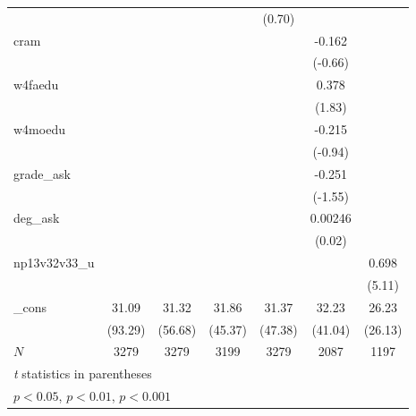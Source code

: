 {\begin{tabular}{l*{6}{c}}
            &                     &                     &                     &      (0.70)         &                     &                     \\
[1em]
cram        &                     &                     &                     &                     &      -0.162         &                     \\
            &                     &                     &                     &                     &     (-0.66)         &                     \\
[1em]
w4faedu     &                     &                     &                     &                     &       0.378         &                     \\
            &                     &                     &                     &                     &      (1.83)         &                     \\
[1em]
w4moedu     &                     &                     &                     &                     &      -0.215         &                     \\
            &                     &                     &                     &                     &     (-0.94)         &                     \\
[1em]
grade\_ask   &                     &                     &                     &                     &      -0.251         &                     \\
            &                     &                     &                     &                     &     (-1.55)         &                     \\
[1em]
deg\_ask     &                     &                     &                     &                     &     0.00246         &                     \\
            &                     &                     &                     &                     &      (0.02)         &                     \\
[1em]
np13v32v33\_u&                     &                     &                     &                     &                     &       0.698\sym{***}\\
            &                     &                     &                     &                     &                     &      (5.11)         \\
[1em]
\_cons      &       31.09\sym{***}&       31.32\sym{***}&       31.86\sym{***}&       31.37\sym{***}&       32.23\sym{***}&       26.23\sym{***}\\
            &     (93.29)         &     (56.68)         &     (45.37)         &     (47.38)         &     (41.04)         &     (26.13)         \\
\hline
\(N\)       &        3279         &        3279         &        3199         &        3279         &        2087         &        1197         \\
\hline\hline
\multicolumn{7}{l}{\footnotesize \textit{t} statistics in parentheses}\\
\multicolumn{7}{l}{\footnotesize \sym{*} \(p<0.05\), \sym{**} \(p<0.01\), \sym{***} \(p<0.001\)}\\
\end{tabular}
}
